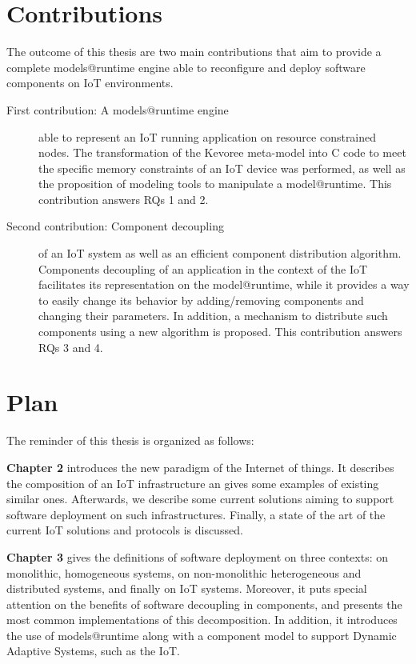 \section{Contributions}
The outcome of this thesis are two main contributions that aim to provide a complete models@runtime engine able to reconfigure and deploy software components on IoT environments.
\begin{description}
	\item[First contribution: A models@runtime engine] able to represent an IoT running application on resource constrained nodes. The transformation of the Kevoree meta-model into C code to meet the specific memory constraints of an IoT device was performed, as well as the proposition of modeling tools to manipulate a model@runtime.
	This contribution answers RQs 1 and 2.
	\item[Second contribution: Component decoupling] of an IoT system as well as an efficient component distribution algorithm. Components decoupling of an application in the context of the IoT facilitates its representation on the model@runtime, while it provides a way to easily change its behavior by adding/removing components and changing their parameters.
	In addition, a mechanism to distribute such components using a new algorithm is proposed.
	This contribution answers RQs 3 and 4.
\end{description}

\section{Plan}
The reminder of this thesis is organized as follows:

\textbf{Chapter 2} introduces the new paradigm of the Internet of things. It describes the composition of an IoT infrastructure an gives some examples of existing similar ones.
Afterwards, we describe some current solutions aiming to support software deployment on such infrastructures.
Finally, a state of the art of the current IoT solutions and protocols is discussed.

\textbf{Chapter 3} gives the definitions of software deployment on three contexts: on monolithic, homogeneous systems, on non-monolithic heterogeneous and distributed systems, and finally on IoT systems.
Moreover, it puts special attention on the benefits of software decoupling in components, and presents the most common implementations of this decomposition.
In addition, it introduces the use of models@runtime along with a component model to support Dynamic Adaptive Systems, such as the IoT.

